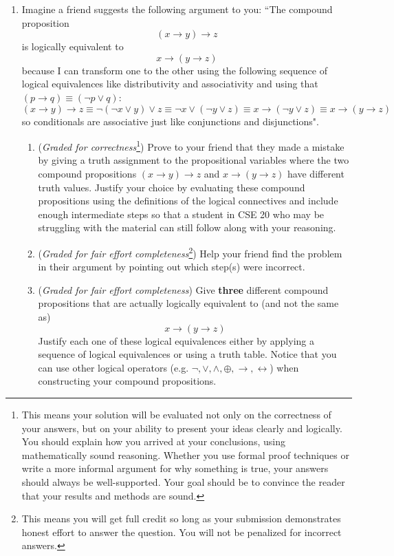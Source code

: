 \begin{enumerate}

   \item Imagine a friend suggests the following argument to you: ``The compound proposition
   \[
   (x \to y) \to z
   \]
   is logically equivalent to 
   \[
   x \to (y \to z)
   \]
   because I can transform one to the other using the following sequence of logical equivalences
   like distributivity and associativity and using that $(p \to q) \equiv (\lnot p \lor q)$: 
   \[
      (x \to y) \to z \equiv
      \lnot (\lnot x \lor y) \lor z \equiv
      \lnot x \lor (\lnot y \lor z) \equiv
      x \to (\lnot y \lor z) \equiv x \to (y \to z)
   \]
   so conditionals
   are associative just like conjunctions and disjunctions".
   
   \begin{enumerate}
   \item ({\it Graded for correctness}\footnote{This means your solution will be
   evaluated not only on the correctness of your answers, but on your ability to 
   present your ideas clearly and logically. You should explain how you arrived at your conclusions, using 
   mathematically sound reasoning. Whether you use formal proof techniques or write a more informal argument for why 
   something is true, your answers should always be well-supported. Your goal should be to convince the reader that 
   your results and methods are sound.}) Prove to your friend that they made a mistake by giving a truth
   assignment to the propositional variables where 
   the two compound propositions 
   $ (x \to y) \to z$ and $ x \to (y \to z)$ have different truth values.
   Justify your choice by evaluating these compound propositions using the definitions of the logical connectives 
   and include enough intermediate steps so that a student in CSE 20 who may be 
   struggling with the material can still follow along with your reasoning.
   
   \item ({\it Graded for fair effort completeness}\footnote{This means you will get full credit so long as your submission 
   demonstrates honest effort to answer the question. You will not be penalized for incorrect answers.}) 
   Help your friend find the problem in their argument by pointing out which step(s) were incorrect.
   
   \item ({\it Graded for fair effort completeness}) Give {\bf three} different compound propositions
   that are actually logically equivalent to (and not the same as)
   \[
   x \to (y \to z)
   \]
   Justify each one of these logical equivalences either by applying a sequence of logical equivalences
   or using a truth table.  Notice that you can use other logical operators (e.g. $\lnot, \lor, \land, \oplus, \to, 
   \leftrightarrow$) 
   when constructing your compound propositions.


\end{enumerate}
\end{enumerate}
